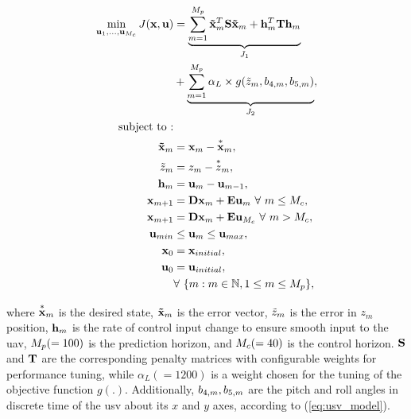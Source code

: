 \documentclass[letterpaper, 10 pt, journal, twoside]{IEEEtran}
\begin{document}
\begin{small}
\begin{equation}
\begin{aligned}
    \min_{\mathbf{u}_1,\ldots,\mathbf{u}_{M_c}} J(\mathbf{x}, \mathbf{u}) &= \underbrace{\sum_{m = 1}^{M_p}\mathbf{\Tilde{\mathbf{x}}}_m^T \mathbf{S} \mathbf{\Tilde{\mathbf{x}}}_m + \mathbf{h}_m^T \mathbf{T} \mathbf{h}_m}_{J_1}\\ &+ \underbrace{\sum_{m = 1}^{M_p}\alpha_L \times g(\Tilde{z}_m, b_{4,m}, b_{5,m})}_{J_2},\\
    \text{subject to :}\\
    \mathbf{\Tilde{\mathbf{x}}}_m &= \mathbf{x}_m - \overset{*}{\mathbf{x}}_m,\\
    \Tilde{z}_m &= z_m-\overset{*}{z}_m,\\
    \mathbf{h}_m &= \mathbf{u}_m-\mathbf{u}_{m-1},\\
    \mathbf{x}_{m+1} &= \mathbf{D}\mathbf{x}_m + \mathbf{E}\mathbf{u}_m~\forall~m \leq M_c, \\
    \mathbf{x}_{m+1} &= \mathbf{D}\mathbf{x}_m + \mathbf{E}\mathbf{u}_{M_c}~\forall~m > M_c, \\
    \mathbf{u}_{min} &\leq \mathbf{u}_m \leq \mathbf{u}_{max},\\
    \mathbf{x}_0 &= \mathbf{x}_{initial},\\
    \mathbf{u}_0 &= \mathbf{u}_{initial},\\
    &\forall~\{m: m\in\mathbb{N}, 1 \leq m \leq M_p\},
\end{aligned}
\end{equation}
\end{small}
where $\overset{*}{\mathbf{x}}_m$ is the desired state, $\mathbf{\Tilde{\mathbf{x}}}_m$ is the error vector, $\Tilde{z}_m$ is the error in $z_m$ position,  $\mathbf{h}_m$ is the rate of control input change to ensure smooth input to the \ac{uav}, $M_p(=100)$ is the prediction horizon, and $M_c(=40)$ is the control horizon. $\mathbf{S}$ and $\mathbf{T}$ are the corresponding penalty matrices with configurable weights for performance tuning, while $\alpha_L(=1200)$ is a weight chosen for the tuning of the objective function $g(.)$. Additionally, $b_{4,m}, b_{5,m}$ are the pitch and roll angles in discrete time of the \ac{usv} about its $x$ and $y$ axes, according to (\ref{eq:usv_model}).
\end{document}
